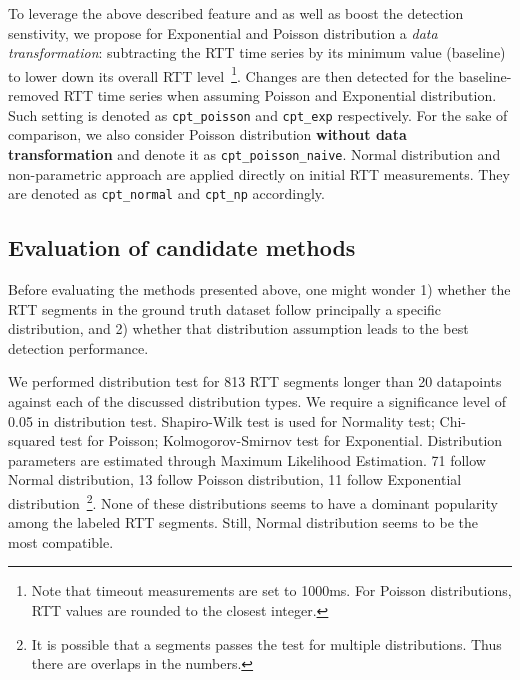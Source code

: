 To leverage the above described feature and as well as boost the detection senstivity, we propose for Exponential and Poisson distribution a \textit{data transformation}: subtracting the RTT time series by its minimum value (baseline) to lower down its overall RTT level~\footnote{Note that timeout measurements are set to 1000ms. 
For Poisson distributions, RTT values are rounded to the closest integer.}. 
Changes are then detected for the baseline-removed RTT time series when assuming Poisson and Exponential distribution.
Such setting is denoted as \texttt{cpt\_poisson} and \texttt{cpt\_exp} respectively.
For the sake of comparison, we also consider Poisson distribution \textbf{without data transformation} and denote it as \texttt{cpt\_poisson\_naive}.
Normal distribution and non-parametric approach are applied directly on initial RTT measurements.
They are denoted as \texttt{cpt\_normal} and \texttt{cpt\_np} accordingly.

\subsection{Evaluation of candidate methods}
\label{sec:eval}

Before evaluating the methods presented above, one might wonder 1) whether the RTT segments in the ground truth dataset follow principally a specific distribution, and 2) whether that distribution assumption leads to the best detection performance.

We performed distribution test for 813 RTT segments longer than 20 datapoints against each of the discussed distribution types. 
We require a significance level of 0.05 in distribution test. 
Shapiro-Wilk test is used for Normality test;
Chi-squared test for Poisson; 
Kolmogorov-Smirnov test for Exponential. 
Distribution parameters are estimated through Maximum Likelihood Estimation.
71 follow Normal distribution, 13 follow Poisson distribution, 11 follow Exponential distribution~\footnote{It is possible that a segments passes the test for multiple distributions. Thus there are overlaps in the numbers.}. 
None of these distributions seems to have a dominant popularity among the labeled RTT segments.
Still, Normal distribution seems to be the most compatible.

